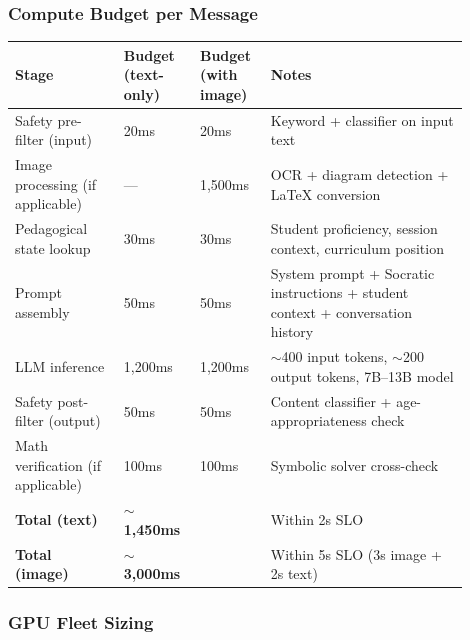 \subsubsection*{Compute Budget per Message}

\begin{tabular}{|p{0.22\linewidth}|p{0.14\linewidth}|p{0.14\linewidth}|p{0.40\linewidth}|}
\hline
\textbf{Stage} & \textbf{Budget (text-only)} & \textbf{Budget (with image)} & \textbf{Notes} \\
\hline
Safety pre-filter (input) & 20ms & 20ms & Keyword + classifier on input text \\
\hline
Image processing (if applicable) & --- & 1,500ms & OCR + diagram detection + LaTeX conversion \\
\hline
Pedagogical state lookup & 30ms & 30ms & Student proficiency, session context, curriculum position \\
\hline
Prompt assembly & 50ms & 50ms & System prompt + Socratic instructions + student context + conversation history \\
\hline
LLM inference & 1,200ms & 1,200ms & $\sim$400 input tokens, $\sim$200 output tokens, 7B--13B model \\
\hline
Safety post-filter (output) & 50ms & 50ms & Content classifier + age-appropriateness check \\
\hline
Math verification (if applicable) & 100ms & 100ms & Symbolic solver cross-check \\
\hline
\textbf{Total (text)} & \textbf{$\sim$1,450ms} & & Within 2s SLO \\
\hline
\textbf{Total (image)} & \textbf{$\sim$3,000ms} & & Within 5s SLO (3s image + 2s text) \\
\hline
\end{tabular}

\subsubsection*{GPU Fleet Sizing}

